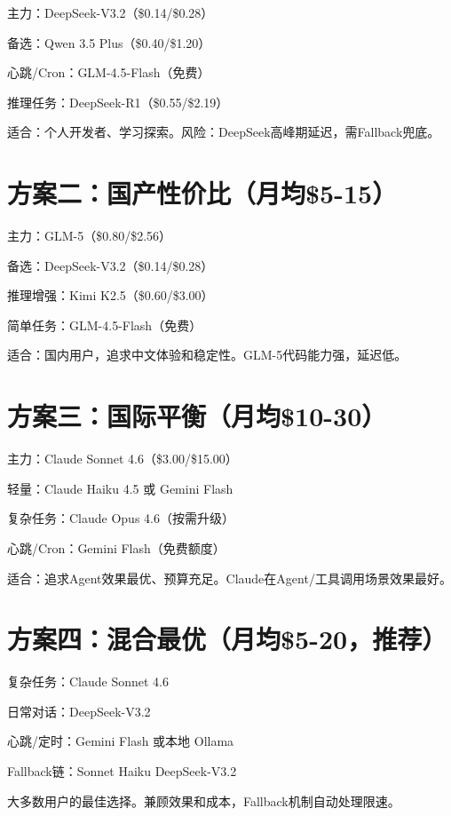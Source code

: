 \documentclass[
  10
]{article}
\begin{document}
主力：DeepSeek-V3.2（\$0.14/\$0.28）

备选：Qwen 3.5 Plus（\$0.40/\$1.20）

心跳/Cron：GLM-4.5-Flash（免费）

推理任务：DeepSeek-R1（\$0.55/\$2.19）

适合：个人开发者、学习探索。风险：DeepSeek高峰期延迟，需Fallback兜底。

\section{方案二：国产性价比（月均\$5-15）}\label{ux65b9ux6848ux4e8cux56fdux4ea7ux6027ux4ef7ux6bd4ux6708ux57475-15}

主力：GLM-5（\$0.80/\$2.56）

备选：DeepSeek-V3.2（\$0.14/\$0.28）

推理增强：Kimi K2.5（\$0.60/\$3.00）

简单任务：GLM-4.5-Flash（免费）

适合：国内用户，追求中文体验和稳定性。GLM-5代码能力强，延迟低。

\section{方案三：国际平衡（月均\$10-30）}\label{ux65b9ux6848ux4e09ux56fdux9645ux5e73ux8861ux6708ux574710-30}

主力：Claude Sonnet 4.6（\$3.00/\$15.00）

轻量：Claude Haiku 4.5 或 Gemini Flash

复杂任务：Claude Opus 4.6（按需升级）

心跳/Cron：Gemini Flash（免费额度）

适合：追求Agent效果最优、预算充足。Claude在Agent/工具调用场景效果最好。

\section{方案四：混合最优（月均\$5-20，推荐）}\label{ux65b9ux6848ux56dbux6df7ux5408ux6700ux4f18ux6708ux57475-20ux63a8ux8350}

复杂任务：Claude Sonnet 4.6

日常对话：DeepSeek-V3.2

心跳/定时：Gemini Flash 或本地 Ollama

Fallback链：Sonnet Haiku DeepSeek-V3.2

大多数用户的最佳选择。兼顾效果和成本，Fallback机制自动处理限速。
\end{document}
